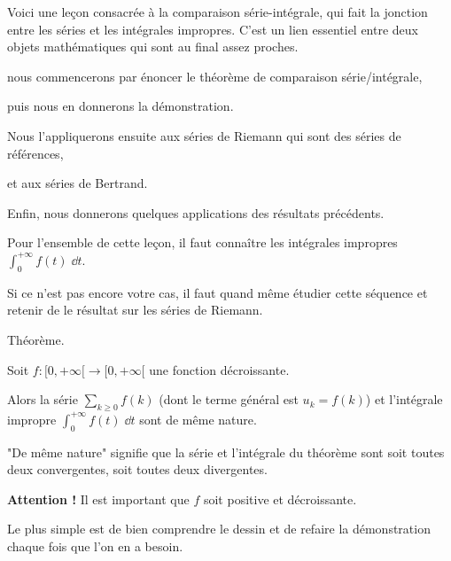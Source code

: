 






\debuttexte

\diapo

Voici une leçon consacrée à la comparaison série-intégrale, qui fait la jonction entre les séries et les intégrales impropres. C'est un lien essentiel entre deux objets mathématiques qui sont au final assez proches.

\change

\change
nous commencerons par énoncer le théorème de comparaison série/intégrale,

\change
puis nous en donnerons la démonstration.

\change
Nous l'appliquerons ensuite aux séries de Riemann qui sont des séries de références,

\change
et aux séries de Bertrand.

\change
Enfin, nous donnerons quelques applications des résultats précédents.

\diapo

Pour l'ensemble de cette leçon, 
il faut connaître les intégrales impropres 
$\int_0^{+\infty} f(t) \;\dd t$.

Si ce n'est pas encore votre cas, il faut quand 
même étudier cette séquence et retenir de 
le résultat sur les séries de Riemann.



\change
Théorème.

Soit $f : [0,+\infty[ \to [0,+\infty[$ une fonction décroissante.

\change
Alors la série $\sum_{k \ge 0} f(k)$ (dont le terme général est $u_k = f(k)$) 
et l'intégrale impropre $\int_0^{+\infty} f(t) \; \dd t$ sont de même nature.

\change
"De même nature" signifie que la série et l'intégrale du théorème sont soit toutes deux
convergentes, soit toutes deux divergentes.

\change
\textbf{Attention !} Il est important que $f$ soit positive et décroissante.

\diapo

Le plus simple est de bien comprendre le dessin et de refaire la démonstration
chaque fois que l'on en a besoin.

